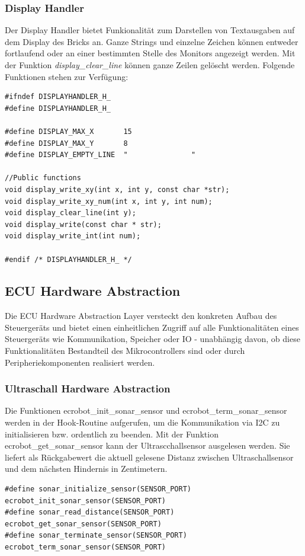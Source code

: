 \newpage
\subsubsection{Display Handler}
Der Display Handler bietet Funkionalität zum Darstellen von Textausgaben auf dem Display des Bricks an.
Ganze Strings und einzelne Zeichen können entweder fortlaufend oder an einer bestimmten Stelle des Monitors angezeigt werden.
Mit der Funktion \textit{display\_clear\_line} können ganze Zeilen gelöscht werden. Folgende Funktionen stehen zur Verfügung:

\begin{lstlisting}[frame=single]  
#ifndef DISPLAYHANDLER_H_
#define DISPLAYHANDLER_H_

#define DISPLAY_MAX_X		15
#define DISPLAY_MAX_Y		8
#define DISPLAY_EMPTY_LINE	"               "

//Public functions
void display_write_xy(int x, int y, const char *str);
void display_write_xy_num(int x, int y, int num);
void display_clear_line(int y);
void display_write(const char * str);
void display_write_int(int num);

#endif /* DISPLAYHANDLER_H_ */
\end{lstlisting}


\subsection{ECU Hardware Abstraction}

Die ECU Hardware Abstraction Layer versteckt den konkreten Aufbau des Steuergeräts und bietet einen einheitlichen Zugriff auf alle Funktionalitäten eines Steuergeräts wie Kommunikation, Speicher oder IO - unabhängig davon, ob diese Funktionalitäten Bestandteil des Mikrocontrollers sind oder durch Peripheriekomponenten realisiert werden.


\subsubsection{Ultraschall Hardware Abstraction}

Die Funktionen {ecrobot\_init\_sonar\_sensor} und {ecrobot\_term\_sonar\_sensor} werden in der Hook-Routine aufgerufen, um die Kommunikation via I2C zu initialisieren bzw. ordentlich zu beenden. Mit der Funktion {ecrobot\_get\_sonar\_sensor} kann der Ultrascchallsensor ausgelesen werden. Sie liefert als Rückgabewert die aktuell gelesene Distanz zwischen Ultraschallsensor und dem nächsten Hindernis in Zentimetern.
\begin{lstlisting}[frame=single]  
#define sonar_initialize_sensor(SENSOR_PORT) ecrobot_init_sonar_sensor(SENSOR_PORT)
#define sonar_read_distance(SENSOR_PORT) ecrobot_get_sonar_sensor(SENSOR_PORT)
#define sonar_terminate_sensor(SENSOR_PORT) ecrobot_term_sonar_sensor(SENSOR_PORT)
\end{lstlisting}

